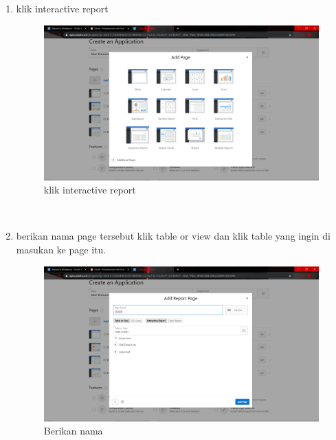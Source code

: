 \begin{enumerate}
\item klik interactive report
\begin{figure}[H]
    \centering
    \includegraphics[scale=0.2]{figures/21}
    \caption{klik interactive report}
    \label{Anaconda Navigator}
\end{figure} \\

\item berikan nama page tersebut klik table or view dan klik table yang ingin di masukan ke page itu.
\begin{figure}[H]
    \centering
    \includegraphics[scale=0.2]{figures/22}
    \caption{Berikan nama}
    \label{Print Hello World}
\end{figure} \\


\end{enumerate}
